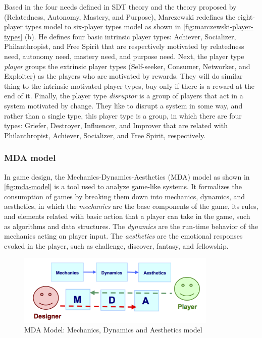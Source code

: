 Based in the four needs defined in SDT theory \cite{DeciRyan2010} and the theory proposed by  (Relatedness, Autonomy, Mastery, and Purpose), Marczewski redefines the eight-player types model to six-player types model as shown in \autoref{fig:marczewski-player-types} (b). He defines four basic intrinsic player types: Achiever, Socializer, Philanthropist, and Free Spirit that are respectively motivated by relatedness need, autonomy need, mastery need, and purpose need. Next, the player type \emph{player} groups the extrinsic player types (Self-seeker, Consumer, Networker, and Exploiter) as the players who are motivated by rewards. They will do similar thing to the intrinsic motivated player types, buy only if there is a reward at the end of it. Finally, the player type \emph{disruptor} is a group of players that act in a system motivated by change. They like to disrupt a system in some way, and rather than a single type, this player type is a group, in which there are four types: Griefer, Destroyer, Influencer, and Improver that are related with Philanthropist, Achiever, Socializer, and Free Spirit, respectively.

\subsubsection{MDA model}
\label{subsec:mda-model-need-theories}

In game design, the Mechanics-Dynamics-Aesthetics (MDA) model \cite{HunickeLeBlancZubek2004} as shown in \autoref{fig:mda-model} is a tool used to analyze game-like systems. It formalizes the consumption of games by breaking them down into mechanics, dynamics, and aesthetics, in which the \emph{mechanics} are the base components of the game, its rules, and elements  related with basic action that a player can take in the game, such as algorithms and data structures. The \emph{dynamics} are the run-time behavior of the mechanics acting on player input. The \emph{aesthetics} are the emotional responses evoked in the player, such as challenge, discover, fantasy, and fellowship.

\begin{figure}[htb]
 \caption{MDA Model: Mechanics, Dynamics and Aesthetics model}
 \label{fig:mda-model}
 \centering
 \includegraphics[width=0.85\textwidth]{images/chap-general-background/mda-model.png}
\end{figure}

